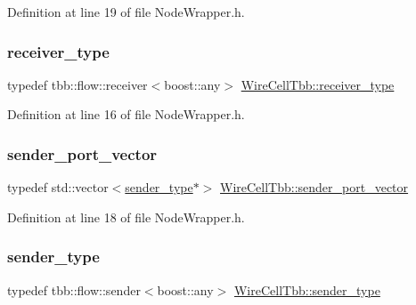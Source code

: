 Definition at line 19 of file Node\+Wrapper.\+h.

\mbox{\label{namespace_wire_cell_tbb_ae1d3e39f466e5c2d3d5198cab827f73f}} 
\subsubsection{\texorpdfstring{receiver\+\_\+type}{receiver\_type}}
{\footnotesize\ttfamily typedef tbb\+::flow\+::receiver$<$boost\+::any$>$ \hyperlink{namespace_wire_cell_tbb_ae1d3e39f466e5c2d3d5198cab827f73f}{Wire\+Cell\+Tbb\+::receiver\+\_\+type}}



Definition at line 16 of file Node\+Wrapper.\+h.

\mbox{\label{namespace_wire_cell_tbb_a99272fef0f0c33dc9d4e6e8f777b2e6e}} 
\subsubsection{\texorpdfstring{sender\+\_\+port\+\_\+vector}{sender\_port\_vector}}
{\footnotesize\ttfamily typedef std\+::vector$<$\hyperlink{namespace_wire_cell_tbb_a6d03ef9befd6914b5cf734e3ebf4fc68}{sender\+\_\+type}$\ast$$>$ \hyperlink{namespace_wire_cell_tbb_a99272fef0f0c33dc9d4e6e8f777b2e6e}{Wire\+Cell\+Tbb\+::sender\+\_\+port\+\_\+vector}}



Definition at line 18 of file Node\+Wrapper.\+h.

\mbox{\label{namespace_wire_cell_tbb_a6d03ef9befd6914b5cf734e3ebf4fc68}} 
\subsubsection{\texorpdfstring{sender\+\_\+type}{sender\_type}}
{\footnotesize\ttfamily typedef tbb\+::flow\+::sender$<$boost\+::any$>$ \hyperlink{namespace_wire_cell_tbb_a6d03ef9befd6914b5cf734e3ebf4fc68}{Wire\+Cell\+Tbb\+::sender\+\_\+type}}



